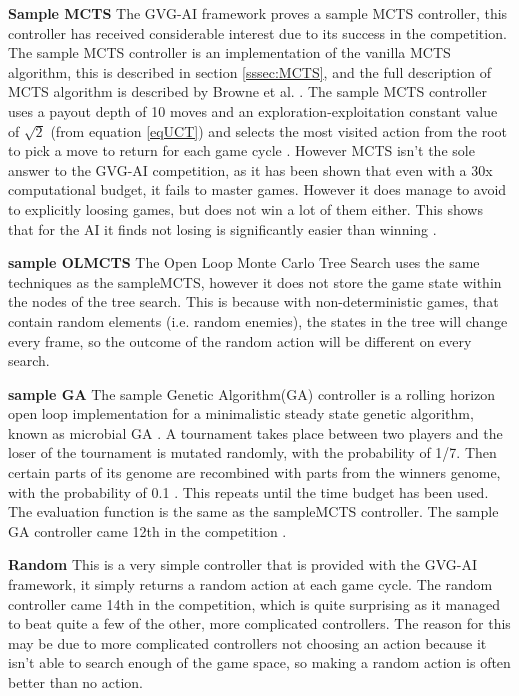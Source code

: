 \documentclass[journal]{IEEEtran}
\begin{document}
		\textbf{Sample MCTS} \label{sssec:sampleMCTS}
			The GVG-AI framework proves a sample MCTS controller, this controller has received considerable interest due to its success in the competition. 
			The sample MCTS controller is an implementation of the vanilla MCTS algorithm, this is described in section \ref{sssec:MCTS}, and the full description of MCTS algorithm is described by Browne et al. \cite{browne2012survey}.
			The sample MCTS controller uses a payout depth of 10 moves and an exploration-exploitation constant value of $\sqrt{2}$ (from equation \ref{eqUCT}) and selects the most visited action from the root to pick a move to return for each game cycle \cite{perez20162014}.
			However MCTS isn't the sole answer to the GVG-AI competition, as it has been shown that even with a 30x computational budget, it fails to master games. However it does manage to avoid to explicitly loosing games, but does not win a lot of them either. This shows that for the AI it finds not losing is significantly easier than winning \cite{nelson2016investigating}.
			
		\textbf{sample OLMCTS} \label{sssec:sampleOLMCTS}
			The Open Loop Monte Carlo Tree Search uses the same techniques as the sampleMCTS, however it does not store the game state within the nodes of the tree search. 
			This is because with non-deterministic games, that contain random elements (i.e. random enemies), the states in the tree will change every frame, so the outcome of the random action will be different on every search.
			

		\textbf{sample GA} \label{sssec:sampleGA}
			The sample Genetic Algorithm(GA) controller is a rolling horizon open loop implementation for a minimalistic steady state genetic algorithm, known as microbial GA \cite{harvey2009microbial, perez20162014}.
			A tournament takes place between two players and the loser of the tournament is mutated randomly, with the probability of 1/7. Then certain parts of its genome are recombined with parts from the winners genome, with the probability of 0.1 \cite{perez20162014}. 
			This repeats until the time budget has been used. The evaluation function is the same as the sampleMCTS controller. 
			The sample GA controller came 12th in the competition \cite{perez20162014}.
			

		\textbf{Random}
			This is a very simple controller that is provided with the GVG-AI framework, it simply returns a random action at each game cycle.
			The random controller came 14th in the competition, which is quite surprising as it managed to beat quite a few of the other, more complicated controllers. 
			The reason for this may be due to more complicated controllers not choosing an action because it isn't able to search enough of the game space, so making a random action is often better than no action.
\end{document}
